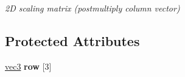 \begin{DoxyCompactItemize}
\begin{DoxyCompactList}\small\item\em 2\-D scaling matrix (postmultiply column vector) \end{DoxyCompactList}\end{DoxyCompactItemize}
\subsection*{\-Protected \-Attributes}
\begin{DoxyCompactItemize}
\item 
\hypertarget{classutil_1_1math_1_1mat33_a1aaa6fe4168c5d6e50f7b48ee418398f}{\hyperlink{classutil_1_1math_1_1vec3}{vec3} {\bfseries row} \mbox{[}3\mbox{]}}\label{classutil_1_1math_1_1mat33_a1aaa6fe4168c5d6e50f7b48ee418398f}

\end{DoxyCompactItemize}
